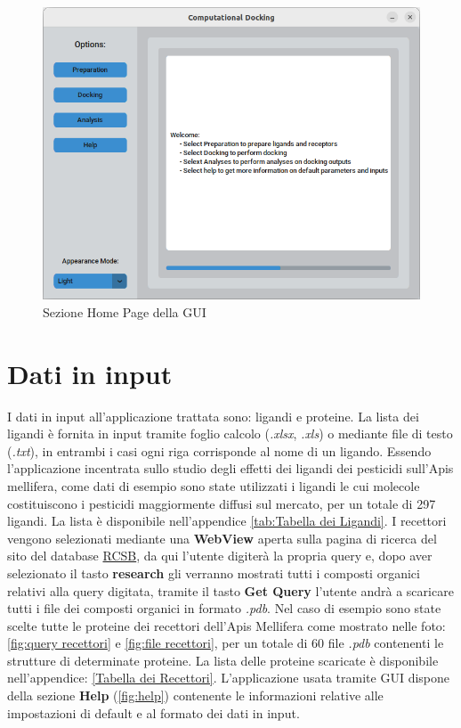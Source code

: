 \begin{figure}[H]
    \centering
    \includegraphics[scale=0.6]{immagini/capitolo3/homePage.png}
    \caption{Sezione Home Page della GUI}
    \label{fig:home page}
\end{figure}

\section{Dati in input}
I dati in input all'applicazione trattata sono: ligandi e proteine.\newline
La lista dei ligandi è fornita in input tramite foglio calcolo (\textit{.xlsx}, \textit{.xls}) o mediante file di testo (\textit{.txt}), 
in entrambi i casi ogni riga corrisponde al nome di un ligando. Essendo l'applicazione incentrata sullo studio degli effetti dei ligandi dei pesticidi sull'Apis mellifera, come dati di esempio sono state utilizzati i ligandi le cui molecole costituiscono i pesticidi maggiormente diffusi sul mercato, per un totale di 297 ligandi. La lista è disponibile nell'appendice \ref{tab:Tabella dei Ligandi}.\newline
I recettori vengono selezionati mediante una \textbf{WebView} aperta sulla pagina di ricerca del sito del database \href{https://www.rcsb.org/search}{RCSB}, da qui l'utente digiterà la propria query e, dopo aver selezionato il  tasto \textbf{research} gli verranno mostrati tutti i composti organici relativi alla query digitata, tramite il tasto \textbf{Get Query} l'utente andrà a scaricare tutti i file  dei composti organici in formato \textit{.pdb}.\newline
Nel caso di esempio sono state scelte tutte le proteine dei recettori dell'Apis Mellifera come mostrato nelle foto: \ref{fig:query recettori} e  \ref{fig:file recettori}, per un totale di 60 file \textit{.pdb} contenenti le strutture di determinate proteine. La lista delle proteine scaricate è disponibile nell'appendice: \ref{Tabella dei Recettori}. L'applicazione usata tramite GUI dispone della sezione \textbf{Help} (\ref{fig:help}) contenente le informazioni relative alle impostazioni di default e al formato dei dati in input.

